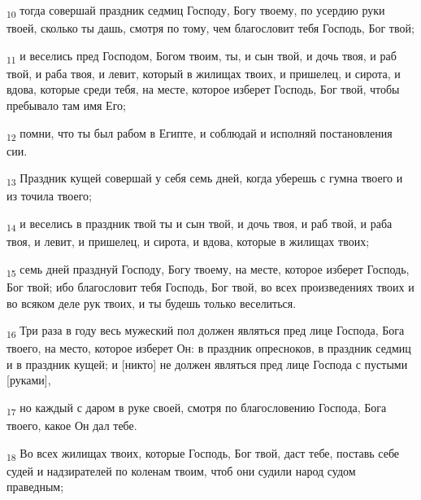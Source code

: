 \begin{tcolorbox}
\textsubscript{10} тогда совершай праздник седмиц Господу, Богу твоему, по усердию руки твоей, сколько ты дашь, смотря по тому, чем благословит тебя Господь, Бог твой;
\end{tcolorbox}
\begin{tcolorbox}
\textsubscript{11} и веселись пред Господом, Богом твоим, ты, и сын твой, и дочь твоя, и раб твой, и раба твоя, и левит, который в жилищах твоих, и пришелец, и сирота, и вдова, которые среди тебя, на месте, которое изберет Господь, Бог твой, чтобы пребывало там имя Его;
\end{tcolorbox}
\begin{tcolorbox}
\textsubscript{12} помни, что ты был рабом в Египте, и соблюдай и исполняй постановления сии.
\end{tcolorbox}
\begin{tcolorbox}
\textsubscript{13} Праздник кущей совершай у себя семь дней, когда уберешь с гумна твоего и из точила твоего;
\end{tcolorbox}
\begin{tcolorbox}
\textsubscript{14} и веселись в праздник твой ты и сын твой, и дочь твоя, и раб твой, и раба твоя, и левит, и пришелец, и сирота, и вдова, которые в жилищах твоих;
\end{tcolorbox}
\begin{tcolorbox}
\textsubscript{15} семь дней празднуй Господу, Богу твоему, на месте, которое изберет Господь, Бог твой; ибо благословит тебя Господь, Бог твой, во всех произведениях твоих и во всяком деле рук твоих, и ты будешь только веселиться.
\end{tcolorbox}
\begin{tcolorbox}
\textsubscript{16} Три раза в году весь мужеский пол должен являться пред лице Господа, Бога твоего, на место, которое изберет Он: в праздник опресноков, в праздник седмиц и в праздник кущей; и [никто] не должен являться пред лице Господа с пустыми [руками],
\end{tcolorbox}
\begin{tcolorbox}
\textsubscript{17} но каждый с даром в руке своей, смотря по благословению Господа, Бога твоего, какое Он дал тебе.
\end{tcolorbox}
\begin{tcolorbox}
\textsubscript{18} Во всех жилищах твоих, которые Господь, Бог твой, даст тебе, поставь себе судей и надзирателей по коленам твоим, чтоб они судили народ судом праведным;
\end{tcolorbox}
